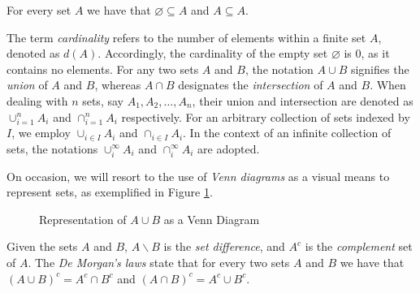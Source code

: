\begin{example}
For every set $A$ we have that $\varnothing \subseteq A$ and $ A \subseteq A$.
\end{example}

The term \emph{cardinality} refers to the number of elements within a finite set $A$, denoted as $d(A)$. Accordingly, the cardinality of the empty set $\varnothing$ is 0, as it contains no elements. For any two sets $A$ and $B$, the notation $A \cup B$ signifies the \emph{union} of $A$ and $B$, whereas $A \cap B$ designates the \emph{intersection} of $A$ and $B$. When dealing with $n$ sets, say $A_1, A_2, \ldots, A_n$, their union and intersection are denoted as $\cup_{i=1}^n A_i$ and $\cap_{i=1}^n A_i$ respectively. For an arbitrary collection of sets indexed by $I$, we employ $\cup_{i \in I} A_i$ and $\cap_{i \in I} A_i$. In the context of an infinite collection of sets, the notations $\cup_{i}^{\infty} A_i$ and $\cap_{i}^{\infty} A_i$ are adopted.

On occasion, we will resort to the use of \emph{Venn diagrams} as a visual means to represent sets, as exemplified in Figure \ref{fig:Venn-diagram}.

\begin{figure}[t]
\centering
{}
\caption{\label{fig:Venn-diagram}Representation of $A \cup B$ as a Venn Diagram}
\end{figure}


Given the sets $A$ and $B$, $A \backslash B$ is the \emph{set difference}, and ${A}^c$ is the \emph{complement} set of $A$. The \emph{De Morgan's laws} state that for every two sets $A$ and $B$ we have that $\left( A \cup B \right)^c = A^c \cap B^c$ and $\left( A \cap B \right)^c = A^c \cup B^c$.

